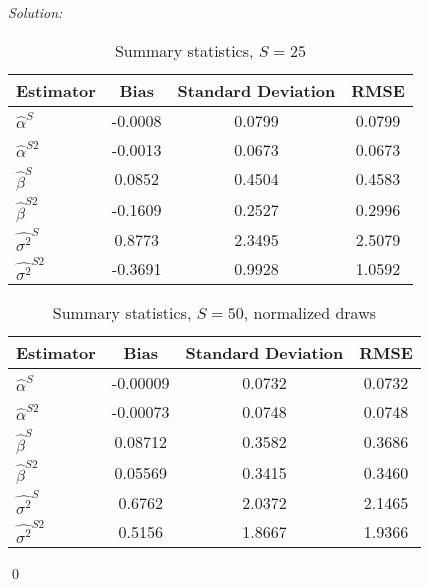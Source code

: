 \documentclass[12pt]{article}
\newenvironment{sol}
    {\emph{Solution:}
    }
    {
    \qed
    }
\begin{document}
\begin{sol}
        \begin{table}[htbp]
            \centering
            \caption{Summary statistics, $S = 25$}
              \begin{tabular}{lccc}
                  \toprule
                    Estimator                & Bias             & Standard Deviation         & RMSE           \\
                  \midrule
                    $\hat{\alpha}^S $  &  -0.0008  &  0.0799  &  0.0799  \\
                    $\hat{\alpha}^{S2}$   & -0.0013& 0.0673  &  0.0673       \\
                    $\hat{\beta}^S $     &  0.0852  &  0.4504 &  0.4583    \\
                    $\hat{\beta}^{S2}$   &  -0.1609& 0.2527 &    0.2996   \\
                    $\hat{\sigma^2}^S $  &   0.8773    &  2.3495 &   2.5079  \\
                    $\hat{\sigma^2}^{S2}$   & -0.3691 & 0.9928 &    1.0592     \\
                  \bottomrule
              \end{tabular}
            \label{tab:cf10}
          \end{table}

          \item \begin{table}[htbp]
            \centering
            \caption{Summary statistics, $S = 50$, normalized draws}
              \begin{tabular}{lccc}
                  \toprule
                    Estimator                & Bias             & Standard Deviation         & RMSE           \\
                  \midrule
                    $\hat{\alpha}^S $     &  -0.00009  & 0.0732  &   0.0732\\
                    $\hat{\alpha}^{S2}$   & -0.00073& 0.0748  &    0.0748  \\
                    $\hat{\beta}^S $     &   0.08712  & 0.3582  &   0.3686   \\
                    $\hat{\beta}^{S2}$   & 0.05569 & 0.3415 &   0.3460   \\
                    $\hat{\sigma^2}^S $     &  0.6762   &  2.0372  & 2.1465    \\
                    $\hat{\sigma^2}^{S2}$   & 0.5156 & 1.8667 &  1.9366  \\
                  \bottomrule
              \end{tabular}
            \label{tab:cf10}
          \end{table}
    

\end{sol}
\end{document}
